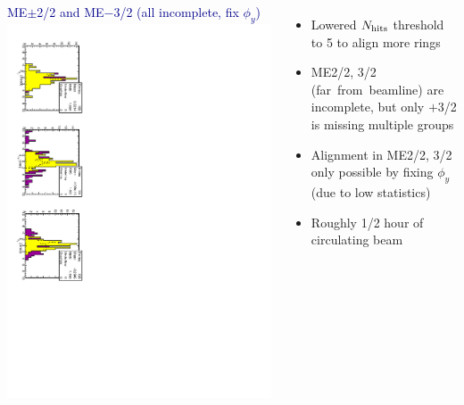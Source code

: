 \documentclass[compress]{beamer}
\begin{document}
\begin{frame}
\begin{columns}
\vspace{0.2 cm}
\textcolor{darkblue}{ME$\pm$2/2 and ME$-$3/2 (all incomplete, fix $\phi_y$)}
\includegraphics[height=\linewidth, angle=90]{skipphiy_me22_mem32.pdf}

\begin{itemize}
\item Lowered $N_{\mbox{\scriptsize hits}}$ threshold to 5 to align more rings
\item ME2/2, 3/2 \mbox{(far from beamline)} are incomplete, but only $+$3/2 is missing multiple groups
\item Alignment in ME2/2, 3/2 only possible by fixing $\phi_y$ (due to low statistics)
\item Roughly 1/2 hour of circulating beam
\end{itemize}
\end{columns}
\end{frame}


\end{document}
